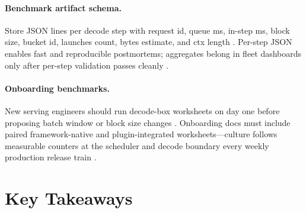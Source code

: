 \paragraph{Benchmark artifact schema.} Store JSON lines per decode step with request id, queue ms, in-step ms, block size, bucket id, launches count, bytes estimate, and ctx length \citep{yirage2026,chen2020compilerbasedhardw,patel2025llminference,kwon2023vllm,taxbreak2026,memoryfloor2026,liu2024deepseekv3,nvidia2024cudagraphs,dao2022flashattention,amd2024aie,amd2024xdna,dlbook,dao2023flashdecoding,nvidia2022hopper,semianalysis2024tma}. Per-step JSON enables fast and reproducible postmortems; aggregates belong in fleet dashboards only after per-step validation passes cleanly \citep{patel2025llminference,yirage2026,chen2020compilerbasedhardw,kwon2023vllm,dlbook}.


\paragraph{Onboarding benchmarks.} New serving engineers should run decode-box worksheets on day one before proposing batch window or block size changes \citep{patel2025llminference,kwon2023vllm,taxbreak2026,memoryfloor2026,yirage2026,chen2020compilerbasedhardw,liu2024deepseekv3,nvidia2024cudagraphs,dao2022flashattention,amd2024aie,amd2024xdna,dlbook,dao2023flashdecoding,nvidia2022hopper,semianalysis2024tma}. Onboarding docs must include paired framework-native and plugin-integrated worksheets---culture follows measurable counters at the scheduler and decode boundary every weekly production release train \citep{patel2025llminference,yirage2026,chen2020compilerbasedhardw,kwon2023vllm,memoryfloor2026,taxbreak2026,dlbook}.

\section{Key Takeaways}
\label{sec:ch28_key_takeaways}

